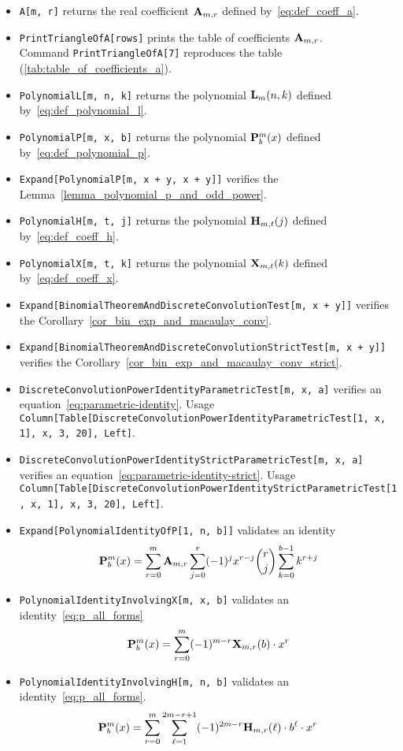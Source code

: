 \begin{itemize}
    \item \texttt{A[m, r]} returns the real coefficient ${\mathbf{A}} \sb{m,r}$ defined by~\eqref{eq:def_coeff_a}.
    \item \texttt{PrintTriangleOfA[rows]} prints the table of coefficients ${\mathbf{A}} \sb{m,r}$. \\
    Command \texttt{PrintTriangleOfA[7]} reproduces the table (\ref{tab:table_of_coefficients_a}).
    \item \texttt{PolynomialL[m, n, k]} returns the polynomial ${\mathbf{L}}\sb{m}(n,k)$ defined by~\eqref{eq:def_polynomial_l}.
    \item \texttt{PolynomialP[m, x, b]} returns the polynomial ${\mathbf{P}}\sp{m} \sb{b}(x)$ defined by~\eqref{eq:def_polynomial_p}.
    \item \texttt{Expand[PolynomialP[m, x + y, x + y]]} verifies the Lemma~\ref{lemma_polynomial_p_and_odd_power}.
    \item \texttt{PolynomialH[m, t, j]} returns the polynomial ${\mathbf{H}} \sb{m,t} (j)$ defined by~\eqref{eq:def_coeff_h}.
    \item \texttt{PolynomialX[m, t, k]} returns the polynomial ${\mathbf{X}}\sb{m,t} (k)$ defined by~\eqref{eq:def_coeff_x}.
    \item \texttt{Expand[BinomialTheoremAndDiscreteConvolutionTest[m, x + y]]} verifies the Corollary~\ref{cor_bin_exp_and_macaulay_conv}.
    \item \texttt{Expand[BinomialTheoremAndDiscreteConvolutionStrictTest[m, x + y]]} verifies the Corollary~\ref{cor_bin_exp_and_macaulay_conv_strict}.
    \item \texttt{DiscreteConvolutionPowerIdentityParametricTest[m, x, a]} verifies an equation~\eqref{eq:parametric-identity}.
    Usage \texttt{Column[Table[DiscreteConvolutionPowerIdentityParametricTest[1, x, 1], {x, 3, 20}], Left]}.
    \item \texttt{DiscreteConvolutionPowerIdentityStrictParametricTest[m, x, a]} verifies an equation~\eqref{eq:parametric-identity-strict}.
    Usage \texttt{Column[Table[DiscreteConvolutionPowerIdentityStrictParametricTest[1, x, 1], {x, 3, 20}], Left]}.
    \item \texttt{Expand[PolynomialIdentityOfP[1, n, b]]} validates an identity
    \[{\mathbf{P}}\sp{m} \sb{b}(x) = \sum_{r=0}^{m} {\mathbf{A}} \sb{m,r} \sum_{j=0}^{r} (-1)^{j} x^{r-j} \binom{r}{j} \sum_{k=0}^{b-1} k^{r+j}\]
    \item \texttt{PolynomialIdentityInvolvingX[m, x, b]} validates an identity~\eqref{eq:p_all_forms}
    \[{\mathbf{P}}\sp{m} \sb{b}(x) = \sum_{r=0}^{m} (-1)^{m-r} {\mathbf{X}}\sb{m,r} (b) \cdot x^r\]
    \item \texttt{PolynomialIdentityInvolvingH[m, n, b]} validates an identity~\eqref{eq:p_all_forms}.
    \[{\mathbf{P}}\sp{m} \sb{b}(x) =\sum_{r=0}^{m} \sum_{\ell=1}^{2m-r+1} (-1)^{2m-r} {\mathbf{H}} \sb{m,r} (\ell) \cdot b^\ell \cdot x^r\]
\end{itemize}

